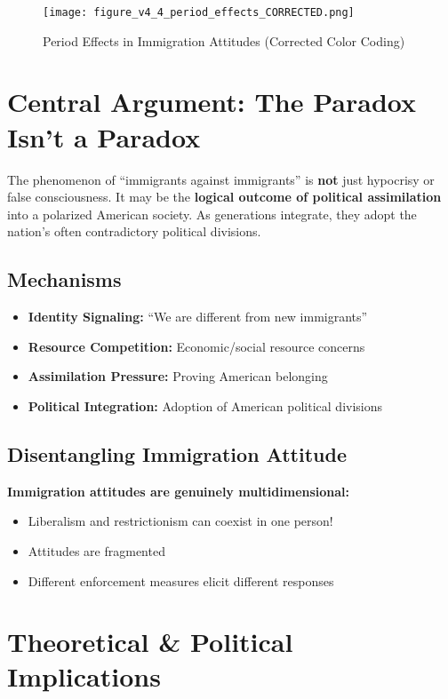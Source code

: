 \documentclass[11pt,letterpaper]{article}
\begin{document}
\begin{figure}[H]
    \centering
    \texttt{[image: figure\_v4\_4\_period\_effects\_CORRECTED.png]}
    \caption{Period Effects in Immigration Attitudes (Corrected Color Coding)}
    \label{fig:period_effects}
\end{figure}

\section{Central Argument: The Paradox Isn't a Paradox}

The phenomenon of ``immigrants against immigrants'' is \textbf{not} just hypocrisy or false consciousness. It may be the \textbf{logical outcome of political assimilation} into a polarized American society. As generations integrate, they adopt the nation's often contradictory political divisions.

\subsection{Mechanisms}
\begin{itemize}
    \item \textbf{Identity Signaling:} ``We are different from new immigrants''
    \item \textbf{Resource Competition:} Economic/social resource concerns
    \item \textbf{Assimilation Pressure:} Proving American belonging
    \item \textbf{Political Integration:} Adoption of American political divisions
\end{itemize}

\subsection{Disentangling Immigration Attitude}

\textbf{Immigration attitudes are genuinely multidimensional:}
\begin{itemize}
    \item Liberalism and restrictionism can coexist in one person!
    \item Attitudes are fragmented
    \item Different enforcement measures elicit different responses
\end{itemize}

\section{Theoretical \& Political Implications}
\end{document}
